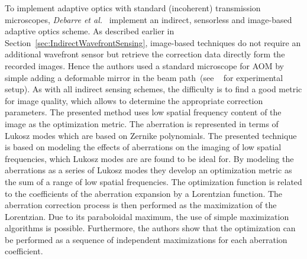 To implement adaptive optics with standard (incoherent) transmission microscopes, \emph{Debarre et al.}~\cite{wide_AOM_loew_freq} implement an indirect, sensorless and image-based adaptive optics scheme. As described earlier in Section~\ref{sec:IndirectWavefrontSensing}, image-based techniques do not require an additional wavefront sensor but retrieve the correction data directly form the recorded images. Hence the authors used a standard microscope for AOM by simple adding a deformable mirror in the beam path~(see ~\cite{wide_AOM_loew_freq} for experimental setup). As with all indirect sensing schemes, the difficulty is to find a good metric for image quality, which allows to determine the appropriate correction parameters. The presented method uses low spatial frequency content of the image as the optimization metric. The aberration is represented in terms of Lukosz modes which are based on Zernike polynomials. The presented technique is based on modeling the effects of aberrations on the imaging of low spatial frequencies, which Lukosz modes are are found to be ideal for. By modeling the aberrations as a series of Lukosz modes they develop an optimization metric as the sum of a range of low spatial frequencies. The optimization function is related to the coefficients of the aberration expansion by a Lorentzian function. The aberration correction process is then performed as the maximization of the Lorentzian. Due to its paraboloidal maximum, the use of simple maximization algorithms is possible. Furthermore, the authors show that the optimization can be performed as a sequence of independent maximizations for each aberration coefficient.

